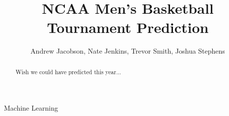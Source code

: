 \documentclass[conference,compsoc]{IEEEtran}
\begin{document}
\title{NCAA Men's Basketball Tournament Prediction}

\author{
    Andrew Jacobson,
    Nate Jenkins,
    Trevor Smith,
    Joshua Stephens\\
}
\maketitle

\thispagestyle{plain}
\pagestyle{plain}


\begin{abstract}
Wish we could have predicted this year...
\end{abstract}

\begin{IEEEkeywords}
Machine Learning
\end{IEEEkeywords}













\end{document}
